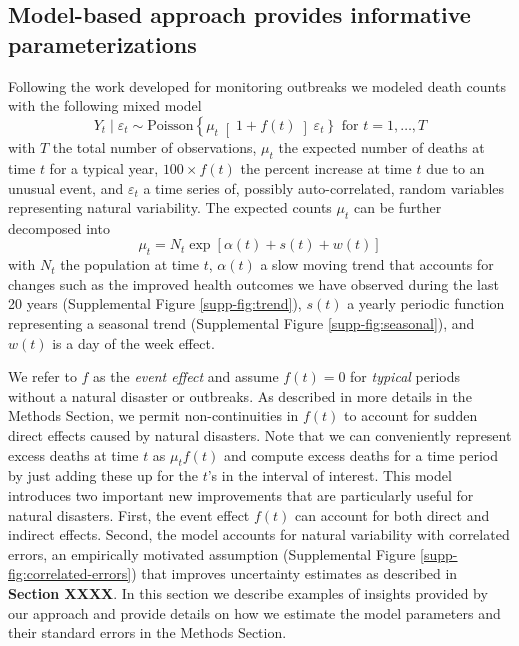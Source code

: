 \documentclass[11pt]{article}
\begin{document}
\subsection{Model-based approach provides informative parameterizations}
\label{subsec:model-based}
Following the work developed for monitoring outbreaks \cite{farrington1996statistical,hohle2008count,noufaily2013improved,salmon2016monitoring} we modeled death counts with the following mixed model
\begin{equation}
    Y_t \mid \varepsilon_t \sim 
    \mbox{Poisson}\left\{ \mu_t \right[1 + f(t) \left]  \varepsilon_t \right\} \mbox{ for } t = 1, \dots,T
\end{equation}
with $T$ the total number of observations, $\mu_t$ the expected number of deaths at time $t$ for a typical year, $100 \times f(t)$ the percent increase at time $t$  due to an unusual event, and $\varepsilon_t$ a time series of, possibly auto-correlated, random variables representing natural variability. The expected counts $\mu_t$ can be further decomposed into 
\begin{equation}
    \mu_t =N_t \exp[\alpha(t) + s(t) + w(t)]
\end{equation}
with $N_t$ the population at time $t$, $\alpha(t)$ a slow moving trend that accounts for changes such as the improved health outcomes we have observed during the last 20 years (Supplemental Figure \ref{supp-fig:trend}), $s(t)$ a yearly periodic function representing a seasonal trend (Supplemental Figure \ref{supp-fig:seasonal}), and $w(t)$ is a day of the week effect. 

We refer to $f$ as the \emph{event effect} and assume $f(t) = 0$ for \emph{typical} periods without a natural disaster or outbreaks.  As described in more details in the Methods Section, we permit non-continuities in $f(t)$ to account for sudden direct effects caused by natural disasters. Note that we can conveniently represent excess deaths at time $t$ as $\mu_t f(t)$ and compute excess deaths for a time period by just adding these up for the $t$'s in the interval of interest. This model introduces two important new improvements that are particularly useful for natural disasters. First, the event effect $f(t)$ can account for both direct and indirect effects. Second, the model accounts for natural variability with correlated errors, an empirically motivated assumption (Supplemental Figure \ref{supp-fig:correlated-errors}) that improves uncertainty estimates as described in \textbf{Section XXXX}. In this section we describe examples of insights provided by our approach and provide details on how we estimate the model parameters and their standard errors in the Methods Section.
\end{document}
